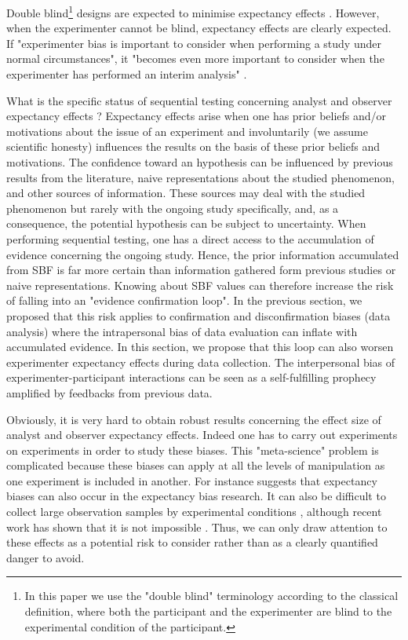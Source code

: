 \documentclass[a4paper,man,natbib,floatsintext,donotrepeattitle]{apa6}
\begin{document}
Double blind\footnote{In this paper we use the "double blind" terminology according to the classical definition, where both the participant and the experimenter are blind to the experimental condition of the participant.} designs are expected to minimise expectancy effects \citep{klein_low_2012,gilder_role_2018}. However, when the experimenter cannot be blind, expectancy effects are clearly expected. If "experimenter bias is important to consider when
performing a study under normal circumstances", it "becomes even more important to consider
when the experimenter has performed an interim analysis" \citep{lakens_performing_2014}. \par

What is the specific status of sequential testing concerning analyst and observer expectancy effects ? Expectancy effects arise when one has prior beliefs and/or motivations about the issue of an experiment and involuntarily (we assume scientific honesty) influences the results on the basis of these prior beliefs and motivations. The confidence toward an hypothesis can be influenced by previous results from the literature, naive representations about the studied phenomenon, and other sources of information. These sources may deal with the studied phenomenon but rarely with the ongoing study specifically, and, as a consequence, the potential hypothesis can be subject to uncertainty. When performing sequential testing, one has a direct access to the accumulation of evidence concerning the ongoing study. Hence, the prior information accumulated from SBF is far more certain than information gathered form previous studies or naive representations. Knowing about SBF values can therefore increase the risk of falling into an "evidence confirmation loop". In the previous section, we proposed that this risk applies to confirmation and disconfirmation biases (data analysis) where the intrapersonal bias of data evaluation can inflate with accumulated evidence. In this section, we propose that this loop can also worsen experimenter expectancy effects during data collection. The interpersonal bias of experimenter-participant interactions can be seen as a self-fulfilling prophecy amplified by feedbacks from previous data. 

Obviously, it is very hard to obtain robust results concerning the effect size of analyst and observer expectancy effects. Indeed one has to carry out experiments on experiments in order to study these biases. This "meta-science" problem is complicated because these biases can apply at all the levels of manipulation as one experiment is included in another. For instance \cite{barber_expecting_1978} suggests that expectancy biases can also occur in the expectancy bias research. It can also be difficult to collect large observation samples by experimental conditions \citep[e.g.,][]{zoble_interaction_1969}, although recent work has shown that it is not impossible \citep {gilder_role_2018}. Thus, we can only draw attention to these effects as a potential risk to consider rather than as a clearly quantified danger to avoid.
\end{document}
